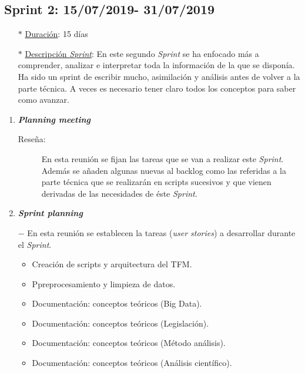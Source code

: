 \subsection{Sprint 2: 15/07/2019- 31/07/2019}\label{sprint2}
\begin{itemize}
\item[$\ast$] \underline{Duración}:  15 días
\item[$\ast$] \underline{Descripción \textit{Sprint}}: En este segundo \textit{Sprint} se ha enfocado más a comprender, analizar e interpretar toda la información de la que se disponía. Ha sido un sprint de escribir mucho, asimilación y análisis antes de volver a la parte técnica. A veces es necesario tener claro todos los conceptos para saber como avanzar. 
\end{itemize}
\begin{enumerate}
\item \textbf{\textit{Planning meeting}}
\begin{description}
	\item[Reseña:] En esta reunión se fijan las tareas que se van a realizar este \textit{Sprint}. Además se añaden algunas nuevas al backlog como las referidas a la parte técnica que se realizarán en scripts sucesivos y que vienen derivadas de las necesidades de éste \textit{Sprint}.
\end{description}
\item \textbf{\textit{Sprint planning}}
	\item[$-$] En esta reunión se establecen la tareas (\textit{user stories}) a desarrollar durante el \textit{Sprint}. 
\begin{itemize}
	\item Creación de scripts y arquitectura del TFM.
	\item Ppreprocesamiento y limpieza de datos.
	\item Documentación: conceptos teóricos (Big Data).
	\item Documentación: conceptos teóricos (Legislación).
	\item Documentación: conceptos teóricos (Método análisis).
	\item Documentación: conceptos teóricos (Análisis científico).


\end{itemize}
\end{enumerate}
